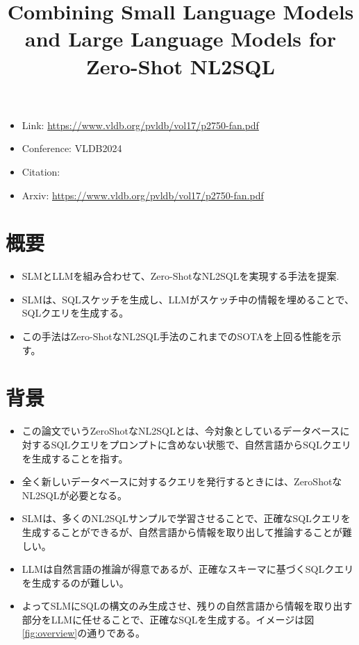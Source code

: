 \documentclass[dvipdfmx,uplatex]{jsarticle}
\title{Combining Small Language Models and Large Language Models for Zero-Shot NL2SQL}
\author{\empty}
\date{\empty}
\theoremstyle{remark}
\newenvironment{simplebox}{
    \begin{tcolorbox}[
        fonttitle=\bfseries,
    ]
}{
    \end{tcolorbox}
}
\begin{document}
\maketitle

\begin{itemize}
    \item Link: \url{https://www.vldb.org/pvldb/vol17/p2750-fan.pdf}
    \item Conference: VLDB2024
    \item Citation: \cite{text2sql_with_slm_and_llm}
    \item Arxiv: \url{https://www.vldb.org/pvldb/vol17/p2750-fan.pdf}
\end{itemize}

\section{概要}
\begin{simplebox}
\begin{itemize}
    \item SLMとLLMを組み合わせて、Zero-ShotなNL2SQLを実現する手法を提案.
    \item SLMは、SQLスケッチを生成し、LLMがスケッチ中の情報を埋めることで、SQLクエリを生成する。
    \item この手法はZero-ShotなNL2SQL手法のこれまでのSOTAを上回る性能を示す。
\end{itemize}
\end{simplebox}

\section{背景}
\begin{simplebox}
\begin{itemize}
    \item この論文でいうZeroShotなNL2SQLとは、今対象としているデータベースに対するSQLクエリをプロンプトに含めない状態で、自然言語からSQLクエリを生成することを指す。
    \item 全く新しいデータベースに対するクエリを発行するときには、ZeroShotなNL2SQLが必要となる。
    \item SLMは、多くのNL2SQLサンプルで学習させることで、正確なSQLクエリを生成することができるが、自然言語から情報を取り出して推論することが難しい。
    \item LLMは自然言語の推論が得意であるが、正確なスキーマに基づくSQLクエリを生成するのが難しい。
    \item よってSLMにSQLの構文のみ生成させ、残りの自然言語から情報を取り出す部分をLLMに任せることで、正確なSQLを生成する。イメージは図\ref{fig:overview}の通りである。
\end{itemize}
\end{simplebox}
\end{document}
